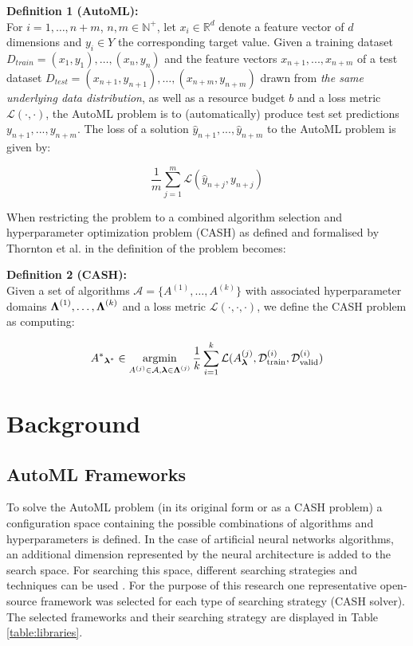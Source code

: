 \documentclass{sig-alternate-br}
\begin{document}
\textbf{Definition 1 (AutoML):} 
\\ For $i = 1, \dots , n + m$, $n,m \in \mathbb{N}^+$,  let $x_i \in \mathbb{R}^d$ denote a feature vector of $d$ dimensions and $y_i \in Y$ the corresponding target value. Given a training dataset $D_{train} = {(x_1, y_1),\dots , (x_{n}, y_{n})}$ and
the feature vectors $x_{n+1}, . . . , x_{n+m}$ of a test dataset $D_{test} = {(x_{n+1}, y_{n+1}), \dots ,(x_{n+m}, y_{n+m})}$
drawn from \textit{the same underlying data distribution}, as well as a resource budget $b$ and a loss metric
$\mathcal{L}(\cdot, \cdot)$, the AutoML problem is to (automatically) produce test set predictions $y_{n+1}, . . . , y_{n+m}$. The
loss of a solution $\hat{y}_{n+1}, . . . , \hat{y}_{n+m}$ to the AutoML problem is given by:

\begin{equation}
   \frac{1}{m} \sum_{j=1}^{m} \mathcal{L}( \hat{y}_{n+j},  {y}_{n+j})
\end{equation}

When restricting the problem to a combined algorithm selection and hyperparameter optimization problem (CASH) as defined and formalised by Thornton et al. in \cite{thornton2013autoweka} the definition of the problem becomes:

\textbf{Definition 2 (CASH):}
\\ Given a set of algorithms $\mathcal{A} = \{A^{(1)}, \dots, A^{(k)}\}$ with associated hyperparameter domains ${\boldsymbol{\Lambda}}^{(1)}, \dots, {\boldsymbol{\Lambda}}^{(k)}$ and a loss metric $\mathcal{L}(\cdot, \cdot, \cdot)$, we define the CASH problem as computing:

\begin{equation}
{A^*}_{\vlambda^*} \in \argmin_{A^{(j)} \in \mathcal{A}, \vlambda \in \vLambda^{(j)}} \frac{1}{k}  \sum_{i=1}^{k} \mathcal{L}(A^{(j)}_\vlambda, \mathcal{D}_{\text{train}}^{(i)}, \mathcal{D}_{\text{valid}}^{(i)})
\end{equation}

\vspace{0.25cm}
\section{Background}

\subsection{AutoML Frameworks}
To solve the AutoML problem (in its original form or as a CASH problem) a configuration space containing the possible combinations of algorithms and hyperparameters is defined. In the case of artificial neural networks algorithms, an additional dimension represented by the neural architecture is added to the search space. For searching this space, different searching strategies and techniques can be used \cite{truong2019towards}. For the purpose of this research one representative open-source framework \cite{gijsbers2019open} was selected for each type of searching strategy (CASH solver). The selected frameworks and their searching strategy are displayed in Table \ref{table:libraries}.
\end{document}
